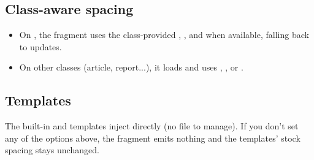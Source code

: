 \documentclass[a4paper,twoside]{article}
\begin{document}
\subsection{Class-aware spacing}
\begin{itemize}
\item On , the fragment uses the class-provided , , and  when available, falling back to  updates.
\item On other classes (article, report...), it loads  and uses , , or .
\end{itemize}
\subsection{Templates}
The built-in  and  templates inject  directly (no  file to manage). If you don't set any of the options above, the fragment emits nothing and the templates' stock spacing stays unchanged.
\end{document}
